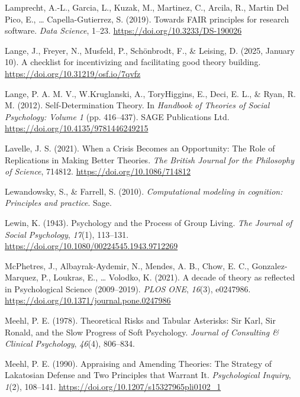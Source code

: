 \documentclass[
  man, noextraspace,floatsintext]{apa6}
\newlength{\cslhangindent}
\newenvironment{CSLReferences}[2] %
 {\begin{list}{}{%
  \setlength{\itemindent}{0pt}
  \setlength{\leftmargin}{0pt}
  \setlength{\parsep}{0pt}
  \ifodd #1
   \setlength{\leftmargin}{\cslhangindent}
   \setlength{\itemindent}{-1\cslhangindent}
  \fi
  \setlength{\itemsep}{#2\baselineskip}}}
 {\end{list}}
\begin{document}
\begin{CSLReferences}{1}{0}
Lamprecht, A.-L., Garcia, L., Kuzak, M., Martinez, C., Arcila, R., Martin Del Pico, E., \ldots{} Capella-Gutierrez, S. (2019). Towards {FAIR} principles for research software. \emph{Data Science}, 1--23. \url{https://doi.org/10.3233/DS-190026}

Lange, J., Freyer, N., Musfeld, P., Schönbrodt, F., \& Leising, D. (2025, January 10). A checklist for incentivizing and facilitating good theory building. \url{https://doi.org/10.31219/osf.io/7qvfz}

Lange, P. A. M. V., W.Kruglanski, A., ToryHiggins, E., Deci, E. L., \& Ryan, R. M. (2012). Self-{Determination Theory}. In \emph{Handbook of {Theories} of {Social Psychology}: {Volume} 1} (pp. 416--437). SAGE Publications Ltd. \url{https://doi.org/10.4135/9781446249215}

Lavelle, J. S. (2021). When a {Crisis Becomes} an {Opportunity}: {The Role} of {Replications} in {Making Better Theories}. \emph{The British Journal for the Philosophy of Science}, 714812. \url{https://doi.org/10.1086/714812}

Lewandowsky, S., \& Farrell, S. (2010). \emph{Computational modeling in cognition: {Principles} and practice}. Sage.

Lewin, K. (1943). Psychology and the {Process} of {Group Living}. \emph{The Journal of Social Psychology}, \emph{17}(1), 113--131. \url{https://doi.org/10.1080/00224545.1943.9712269}

McPhetres, J., Albayrak-Aydemir, N., Mendes, A. B., Chow, E. C., Gonzalez-Marquez, P., Loukras, E., \ldots{} Volodko, K. (2021). A decade of theory as reflected in {Psychological Science} (2009--2019). \emph{PLOS ONE}, \emph{16}(3), e0247986. \url{https://doi.org/10.1371/journal.pone.0247986}

Meehl, P. E. (1978). Theoretical {Risks} and {Tabular Asterisks}: {Sir Karl}, {Sir Ronald}, and the {Slow Progress} of {Soft Psychology}. \emph{Journal of Consulting \& Clinical Psychology}, \emph{46}(4), 806--834.

Meehl, P. E. (1990). Appraising and {Amending Theories}: {The Strategy} of {Lakatosian Defense} and {Two Principles} that {Warrant It}. \emph{Psychological Inquiry}, \emph{1}(2), 108--141. \url{https://doi.org/10.1207/s15327965pli0102_1}


\end{CSLReferences}
\end{document}

